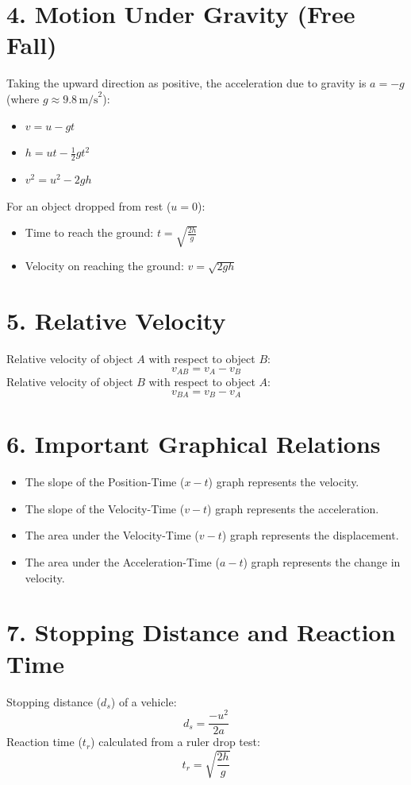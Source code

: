 \documentclass[12pt, a4paper]{article}
\begin{document}
\section*{4. Motion Under Gravity (Free Fall)}
Taking the upward direction as positive, the acceleration due to gravity is $a = -g$ (where $g \approx 9.8 \, \text{m/s}^2$):
\begin{itemize}
    \item $v = u - gt$
    \item $h = ut - \frac{1}{2}gt^2$
    \item $v^2 = u^2 - 2gh$
\end{itemize}
For an object dropped from rest ($u = 0$):
\begin{itemize}
    \item Time to reach the ground: $t = \sqrt{\frac{2h}{g}}$
    \item Velocity on reaching the ground: $v = \sqrt{2gh}$
\end{itemize}

\section*{5. Relative Velocity}
Relative velocity of object $A$ with respect to object $B$:
\[ v_{AB} = v_A - v_B \]
Relative velocity of object $B$ with respect to object $A$:
\[ v_{BA} = v_B - v_A \]

\section*{6. Important Graphical Relations}
\begin{itemize}
    \item The slope of the Position-Time ($x-t$) graph represents the velocity.
    \item The slope of the Velocity-Time ($v-t$) graph represents the acceleration.
    \item The area under the Velocity-Time ($v-t$) graph represents the displacement.
    \item The area under the Acceleration-Time ($a-t$) graph represents the change in velocity.
\end{itemize}

\section*{7. Stopping Distance and Reaction Time}
Stopping distance ($d_s$) of a vehicle:
\[ d_s = \frac{-u^2}{2a} \]
Reaction time ($t_r$) calculated from a ruler drop test:
\[ t_r = \sqrt{\frac{2h}{g}} \]
\end{document}
